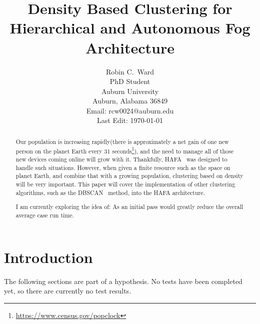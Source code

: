 \documentclass[letterpaper,twocolumn,10pt]{article}
\begin{document}



\title{\Large \bf Density Based Clustering for Hierarchical and Autonomous Fog Architecture}


\author{
{\rm Robin C.\ Ward}\\
PhD Student\\
Auburn University\\
Auburn, Alabama 36849\\
Email: rcw0024@auburn.edu\\
Last Edit: \today
} %

\maketitle

\begin{abstract}
Our population is increasing rapidly(there is approximately a net gain of one new person on the planet Earth every 31 seconds\footnote{\url{https://www.census.gov/popclock}}), and the need to manage all of those new devices coming online will grow with it. Thankfully, HAFA~\cite{10.1145/3229710.3229740} was designed to handle such situations. However, when given a finite resource such as the space on planet Earth, and combine that with a growing population, clustering based on density will be very important. This paper will cover the implementation of other clustering algorithms, such as the DBSCAN~\cite{10.5555/3001460.3001507} method, into the HAFA architecture.

I am currently exploring the idea of:
As an initial pass would greatly reduce the overall average case run time.
\end{abstract}


\section{Introduction}

The following sections are part of a hypothesis. No tests have been completed yet, so there are currently no test results.
\end{document}
